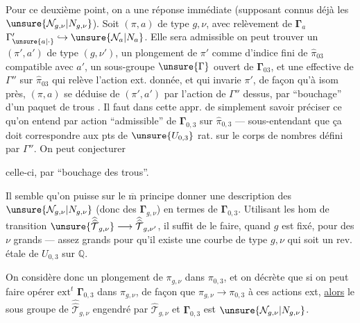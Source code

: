 
Pour ce deuxième point, on a une réponse immédiate (supposant connus déjà les
$\unsure{\mathcal{N}_{g,\nu}|N_{g,\nu}}$). Soit  $(\pi,a)$ de type $g,\nu$,
avec  relèvement  de $\boldsymbol{\Gamma}_a$ 
$\Gamma'_{\unsure{a|\cdot}}\hookrightarrow \unsure{\mathcal{N}_a|N_a}$.
Elle sera admissible  on peut trouver
un $(\pi',a')$ de type $(g,\nu')$,  un
plongement de $\pi'$ comme  d'indice fini de $\widehat{\pi}_{03}$ compatible avec $a'$,
 un sous-groupe $\unsure{\Gamma}$ ouvert  de $\boldsymbol{\Gamma}_{03}$, et
une  effective  de $\Gamma''$ 
sur $\widehat{\pi}_{03}$ qui
relève l'action ext. donnée, et qui
invarie $\pi'$, de façon qu'à isom
près, $(\pi,a)$ 
se déduise de $(\pi',a')$
par l'action de $\Gamma''$ dessus, par ``bouchage''
d'un paquet de trous . Il faut
dans cette appr. de simplement savoir
préciser  ce qu'on entend par
action ``admissible'' de  $\boldsymbol{\Gamma}_{0,3}$ sur $\widehat{\pi}_{0,3}$
--- sous-entendant que ça doit correspondre
aux pts de $\unsure{U_{0,3}}$ rat. sur  le corps
de nombres défini par $\Gamma''$. On peut conjecturer



celle-ci, par ``bouchage des trous''.

Il semble qu'on puisse sur le $\overline{\mathrm m}$
principe donner une description des
$\unsure{\mathcal{N}_{g,\nu}|N_{g,\nu}}$ (donc des $\boldsymbol{\Gamma}_{g,\nu}$)
en termes de
$\boldsymbol{\Gamma}_{0,3}$. Utilisant les hom de transition
$\unsure{\widehat{\widehat{\mathcal{T}}}_{g,\nu}}
\longrightarrow
\widehat{\widehat{\mathcal{T}}}_{g,\nu'}$,
il suffit de le
faire, quand $g$ est fixé, pour des $\nu$
grands --- assez grands pour qu'il
existe une courbe  de type $g,\nu$ 
qui soit un rev. étale de $U_{0,3}$ sur $\mathbb{Q}$.

On considère donc un plongement 
de $\pi_{g,\nu}$ dans $\pi_{0,3}$, et on
décrète que si  on peut faire
opérer $\mathrm{ext}^{t}$ $\boldsymbol{\Gamma}_{0,3}$ dans $\pi_{g,\nu}$, de
façon que $\pi_{g,\nu}\longrightarrow\pi_{0,3}$ 
à ces actions ext, \uline{alors} le sous
groupe de $\widehat{\widehat{\mathcal{T}}}_{g,\nu}$ engendré par
$\widehat{\mathcal{T}}_{g,\nu}$ et
$\boldsymbol{\Gamma}_{0,3}$ est 
$\unsure{\mathcal{N}_{g,\nu}|N_{g,\nu}}$.

